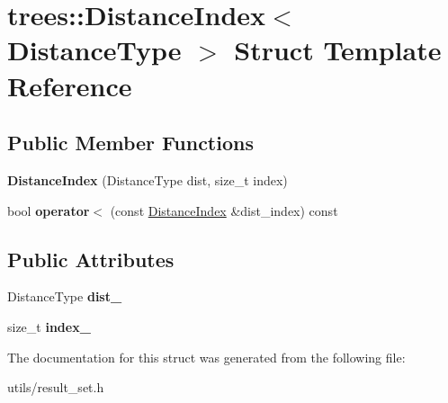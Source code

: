 \hypertarget{structtrees_1_1_distance_index}{}\section{trees\+:\+:Distance\+Index$<$ Distance\+Type $>$ Struct Template Reference}
\label{structtrees_1_1_distance_index}
\subsection*{Public Member Functions}
\begin{DoxyCompactItemize}
\item 
\mbox{\label{structtrees_1_1_distance_index_a90ce5ece57dc6f6807a3af01f8185ab3}} 
{\bfseries Distance\+Index} (Distance\+Type dist, size\+\_\+t index)
\item 
\mbox{\label{structtrees_1_1_distance_index_a244d8c16ca20d24b3d674cc597c0593a}} 
bool {\bfseries operator$<$} (const \hyperlink{structtrees_1_1_distance_index}{Distance\+Index} \&dist\+\_\+index) const
\end{DoxyCompactItemize}
\subsection*{Public Attributes}
\begin{DoxyCompactItemize}
\item 
\mbox{\label{structtrees_1_1_distance_index_a21357a72377919a1f39016632e07eefc}} 
Distance\+Type {\bfseries dist\+\_\+}
\item 
\mbox{\label{structtrees_1_1_distance_index_a8c9025202c2717d9271507e4ca4d7611}} 
size\+\_\+t {\bfseries index\+\_\+}
\end{DoxyCompactItemize}


The documentation for this struct was generated from the following file\+:\begin{DoxyCompactItemize}
\item 
utils/result\+\_\+set.\+h\end{DoxyCompactItemize}
